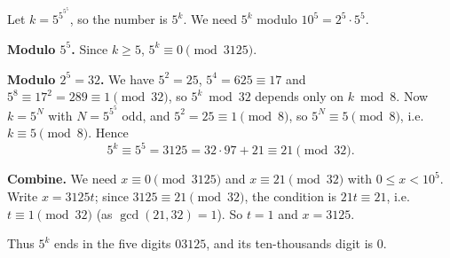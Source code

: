 Let $k=5^{5^{5^5}}$, so the number is $5^k$. We need $5^k$ modulo $10^5=2^5\cdot5^5$.

\textbf{Modulo $5^5$.} Since $k\ge5$, $5^k\equiv0\pmod{3125}$.

\textbf{Modulo $2^5=32$.} We have $5^2=25$, $5^4=625\equiv17$ and $5^8\equiv17^2=289\equiv1\pmod{32}$, so $5^k\bmod32$ depends only on $k\bmod8$. Now $k=5^{N}$ with $N=5^{5^5}$ odd, and $5^2=25\equiv1\pmod8$, so $5^{N}\equiv5\pmod8$, i.e. $k\equiv5\pmod 8$. Hence
\[5^k\equiv5^5=3125=32\cdot97+21\equiv21\pmod{32}.\]

\textbf{Combine.} We need $x\equiv0\pmod{3125}$ and $x\equiv21\pmod{32}$ with $0\le x<10^5$. Write $x=3125t$; since $3125\equiv21\pmod{32}$, the condition is $21t\equiv21$, i.e. $t\equiv1\pmod{32}$ (as $\gcd(21,32)=1$). So $t=1$ and $x=3125$.

Thus $5^k$ ends in the five digits $03125$, and its ten-thousands digit is $\boxed{0}$.
